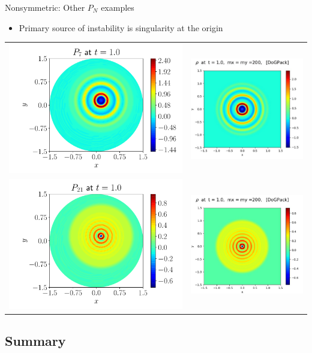 \documentclass{beamer}
\begin{document}
\begin{frame}{Nonsymmetric: Other $P_N$ examples}
    \begin{itemize}
        \item Primary source of instability is singularity at the origin
    \end{itemize}
    \centering
	\begin{tabular}{c|c}
 	    \includegraphics[width=0.35\linewidth]{figures/physical_final_p7_shift.pdf} &
    	\includegraphics[width=0.3\linewidth]{figures/Minwoo_p7.png} \\
    	\includegraphics[width=0.35\linewidth]{figures/physical_final_p21_shift.pdf} &
    	\includegraphics[width=0.3\linewidth]{figures/Minwoo_p21.png}
    \end{tabular}
\end{frame}

\subsection*{Summary}
\end{document}
